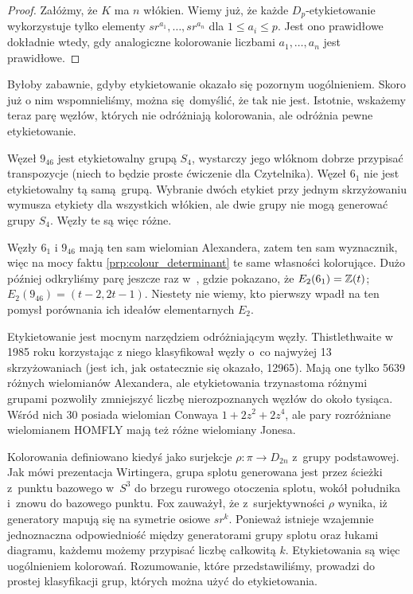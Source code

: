 \begin{proof}
    Załóżmy, że $K$ ma $n$ włókien.
    Wiemy już, że każde $D_p$-etykietowanie wykorzystuje tylko elementy $sr^{a_1}, \ldots, sr^{a_n}$ dla $1 \le a_i \le p$.
    Jest ono prawidłowe dokładnie wtedy, gdy analogiczne kolorowanie liczbami $a_1, \ldots, a_n$ jest prawidłowe.
\end{proof}

Byłoby zabawnie, gdyby etykietowanie okazało się pozornym uogólnieniem.
Skoro już o nim wspomnieliśmy, można się domyślić, że tak nie jest.
Istotnie, wskażemy teraz parę węzłów, których nie odróżniają kolorowania, ale odróżnia pewne etykietowanie.

\begin{example}
    Węzeł $9_{46}$ jest etykietowalny grupą $S_4$, wystarczy jego włóknom dobrze przypisać transpozycje (niech to będzie proste ćwiczenie dla Czytelnika).
    Węzeł $6_1$ nie jest etykietowalny tą samą grupą.
    Wybranie dwóch etykiet przy jednym skrzyżowaniu wymusza etykiety dla wszystkich włókien, ale dwie grupy nie mogą generować grupy $S_4$.
    Węzły te są więc różne.
\end{example}

Węzły $6_1$ i $9_{46}$ mają ten sam wielomian Alexandera, zatem ten sam wyznacznik, więc na mocy faktu \ref{prp:colour_determinant} te same własności kolorujące.
%
Dużo później odkryliśmy parę jeszcze raz w~\cite[s. 138]{burde2014}, gdzie pokazano, że  $E_2(6_1) = \mathbb Z(t)$; $E_2(9_{46}) = (t-2, 2t-1)$.
Niestety nie wiemy, kto pierwszy wpadł na ten pomysł porównania ich ideałów elementarnych $E_2$. 

Etykietowanie jest mocnym narzędziem odróżniającym węzły.
Thistlethwaite w 1985 roku korzystając z niego klasyfikował węzły o~co najwyżej 13 skrzyżowaniach (jest ich, jak ostatecznie się okazało, 12965).
%
Mają one tylko 5639 różnych wielomianów Alexandera, ale etykietowania trzynastoma różnymi grupami pozwoliły zmniejszyć liczbę nierozpoznanych węzłów do około tysiąca.
Wśród nich 30 posiada wielomian Conwaya $1 + 2z^2 + 2z^4$, ale pary rozróżniane wielomianem HOMFLY mają też różne wielomiany Jonesa.

Kolorowania definiowano kiedyś jako surjekcje $\rho \colon \pi \to D_{2n}$ z~grupy podstawowej.
Jak mówi prezentacja Wirtingera, grupa splotu generowana jest przez ścieżki z~punktu bazowego w~$S^3$ do brzegu rurowego otoczenia splotu, wokół południka i~znowu do bazowego punktu.
%
Fox zauważył, że z~surjektywności $\rho$ wynika, iż generatory mapują się na symetrie osiowe $sr^k$.
Ponieważ istnieje wzajemnie jednoznaczna odpowiedniość między generatorami grupy splotu oraz łukami diagramu, każdemu możemy przypisać liczbę całkowitą $k$.
Etykietowania są więc uogólnieniem kolorowań.
Rozumowanie, które przedstawiliśmy, prowadzi do prostej klasyfikacji grup, których można użyć do etykietowania.

